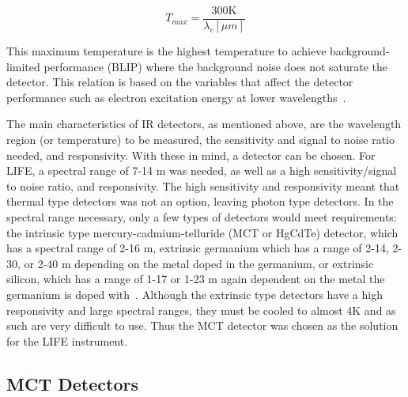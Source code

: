 \begin{equation}\label{IR_detector_temp_rel}
    T_{max} = \frac{300\mathrm{K}}{\lambda_c[\mu m]}
\end{equation}

This maximum temperature is the highest temperature to achieve background-limited performance (BLIP) where the background noise does not saturate the detector. This relation is based on the variables that affect the detector performance such as electron excitation energy at lower wavelengths~\citep{IR_detector_textbook}. 

The main characteristics of IR detectors, as mentioned above, are the wavelength region (or temperature) to be measured, the sensitivity and signal to noise ratio needed, and responsivity. With these in mind, a detector can be chosen. For LIFE, a spectral range of 7-14 \textmu m was needed, as well as a high sensitivity/signal to noise ratio, and responsivity. The high sensitivity and responsivity meant that thermal type detectors was not an option, leaving photon type detectors. In the spectral range necessary, only a few types of detectors would meet requirements: the intrinsic type mercury-cadmium-telluride (MCT or HgCdTe) detector, which has a spectral range of 2-16 \textmu m, extrinsic germanium which has a range of 2-14, 2-30, or 2-40 \textmu m depending on the metal doped in the germanium, or extrinsic silicon, which has a range of 1-17 or 1-23 \textmu m again dependent on the metal the germanium is doped with~\citep{hamamatsu_ir_detectors}. Although the extrinsic type detectors have a high responsivity and large spectral ranges, they must be cooled to almost 4K and as such are very difficult to use. Thus the MCT detector was chosen as the solution for the LIFE instrument.

\subsection{MCT Detectors}\label{MCT_detectors}

